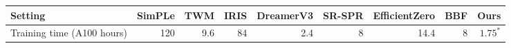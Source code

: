\begin{tabular}{l|rrrrrrr|r}
    \toprule
    Setting                    & SimPLe & TWM & IRIS & DreamerV3 & SR-SPR & EfficientZero & BBF & Ours     \\
    \midrule
    Training time (A100 hours) & 120    & 9.6 & 84   & 2.4       & 8      & 14.4          & 8   & $1.75^*$ \\
    \bottomrule
\end{tabular}